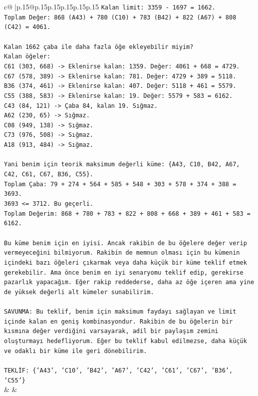 \documentclass{article}
\begin{document}
{\begin{supertabular}{c@{$\;$}|p{.15\linewidth}@{}p{.15\linewidth}p{.15\linewidth}p{.15\linewidth}p{.15\linewidth}p{.15\linewidth}}
{{{\texttt{Kalan limit: 3359 {-} 1697 = 1662.} \\
\texttt{Toplam Değer: 868 (A43) + 780 (C10) + 783 (B42) + 822 (A67) + 808 (C42) = 4061.} \\
\\ 
\texttt{Kalan 1662 çaba ile daha fazla öğe ekleyebilir miyim?} \\
\texttt{Kalan öğeler:} \\
\texttt{C61 (303, 668) {-}> Eklenirse kalan: 1359. Değer: 4061 + 668 = 4729.} \\
\texttt{C67 (578, 389) {-}> Eklenirse kalan: 781. Değer: 4729 + 389 = 5118.} \\
\texttt{B36 (374, 461) {-}> Eklenirse kalan: 407. Değer: 5118 + 461 = 5579.} \\
\texttt{C55 (388, 583) {-}> Eklenirse kalan: 19. Değer: 5579 + 583 = 6162.} \\
\texttt{C43 (84, 121) {-}> Çaba 84, kalan 19. Sığmaz.} \\
\texttt{A62 (230, 65) {-}> Sığmaz.} \\
\texttt{C08 (949, 138) {-}> Sığmaz.} \\
\texttt{C73 (976, 508) {-}> Sığmaz.} \\
\texttt{A18 (913, 484) {-}> Sığmaz.} \\
\\ 
\texttt{Yani benim için teorik maksimum değerli küme: \{A43, C10, B42, A67, C42, C61, C67, B36, C55\}.} \\
\texttt{Toplam Çaba: 79 + 274 + 564 + 585 + 548 + 303 + 578 + 374 + 388 = 3693.} \\
\texttt{3693 <= 3712. Bu geçerli.} \\
\texttt{Toplam Değerim: 868 + 780 + 783 + 822 + 808 + 668 + 389 + 461 + 583 = 6162.} \\
\\ 
\texttt{Bu küme benim için en iyisi. Ancak rakibin de bu öğelere değer verip vermeyeceğini bilmiyorum. Rakibin de memnun olması için bu kümenin içindeki bazı öğeleri çıkarmak veya daha küçük bir küme teklif etmek gerekebilir. Ama önce benim en iyi senaryomu teklif edip, gerekirse pazarlık yapacağım. Eğer rakip reddederse, daha az öğe içeren ama yine de yüksek değerli alt kümeler sunabilirim.} \\
\\ 
\texttt{SAVUNMA: Bu teklif, benim için maksimum faydayı sağlayan ve limit içinde kalan en geniş kombinasyondur. Rakibin de bu öğelerin bir kısmına değer verdiğini varsayarak, adil bir paylaşım zemini oluşturmayı hedefliyorum. Eğer bu teklif kabul edilmezse, daha küçük ve odaklı bir küme ile geri dönebilirim.} \\
\\ 
\texttt{TEKLİF: \{'A43', 'C10', 'B42', 'A67', 'C42', 'C61', 'C67', 'B36', 'C55'\}} \\
            }
        }
    }
    & & \\ \\


\end{supertabular}}
\end{document}
